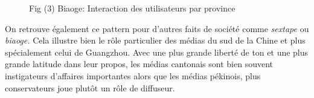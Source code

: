 \begin{figure}
  \caption{
    Fig (3) Biaoge: Interaction des utilisateurs par province
  }
\end{figure}

On retrouve \'egalement ce pattern pour d{\textquoteright}autres faits
de soci\'et\'e comme \textit{sextape} ou \textit{biaoge. }Cela illustre
bien le r\^ole particulier des m\'edias du sud de la Chine et plus
sp\'ecialement celui de Guangzhou. Avec une plus grande libert\'e de
ton et une plus grande latitude dans leur propos, les m\'edias
cantonais sont bien souvent instigateurs d{\textquoteright}affaires
importantes alors que les m\'edias p\'ekinois, plus conservateurs joue
plut\^ot un r\^ole de diffuseur. 


